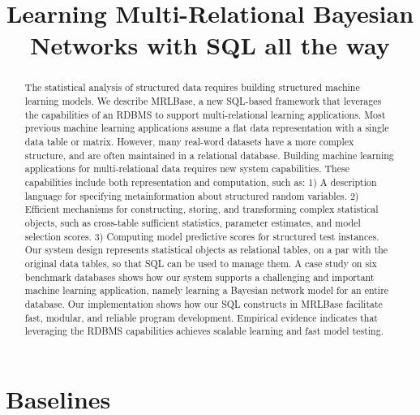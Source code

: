 \documentclass{acm_proc_article-sp}
\begin{document}
\title{Learning Multi-Relational Bayesian Networks with SQL all the way}

\maketitle  
\begin{abstract} 
The statistical analysis of structured data requires building structured machine learning models. We describe MRLBase, a new SQL-based framework that leverages the capabilities of an RDBMS to support multi-relational learning applications. Most previous machine learning applications assume a flat data representation with a single data table or matrix. However, many real-word datasets have a more complex structure, and are often maintained in a relational database.
Building machine learning applications for multi-relational data requires new system capabilities. These capabilities include both representation and computation, such as: 1) A description language for specifying metainformation about structured random variables. 2) Efficient mechanisms for constructing, storing, and transforming complex statistical objects, such as cross-table sufficient statistics, parameter estimates, and model selection scores. 3) Computing model predictive scores for structured test instances. Our system design represents statistical objects as  relational tables, on a par with the original data tables, so that SQL can be used  to manage them. A case study on six benchmark databases shows how our system supports a challenging and important machine learning application, namely learning a Bayesian network model for an entire database. Our implementation shows how our SQL constructs in MRLBase facilitate fast, modular, and reliable program development. Empirical evidence indicates that leveraging the RDBMS capabilities  achieves scalable learning and fast model testing.
\end{abstract}
%
\section{Baselines}
\end{document}
